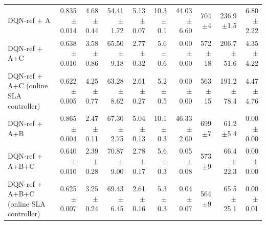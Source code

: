 \begin{table}[t]
\begin{tabular}{lrrrrrrrrr}
DQN-ref + A & 0.835$\pm$0.014 & 4.68$\pm$0.44 & 54.41$\pm$1.72 & 5.13$\pm$0.07 & 10.3$\pm$0.1 & 44.03$\pm$6.60 & 704$\pm$4 & 236.9$\pm$1.5 & 6.80$\pm$2.22 \\
DQN-ref + A+C & 0.638$\pm$0.010 & 3.58$\pm$0.86 & 65.50$\pm$9.18 & 2.77$\pm$0.32 & 5.6$\pm$0.6 & 0.00$\pm$0.00 & 572$\pm$18 & 206.7$\pm$51.6 & 4.35$\pm$4.22 \\
DQN-ref + A+C (online SLA controller) & 0.622$\pm$0.005 & 4.25$\pm$0.77 & 63.28$\pm$8.62 & 2.61$\pm$0.27 & 5.2$\pm$0.5 & 0.00$\pm$0.00 & 563$\pm$15 & 191.2$\pm$78.4 & 4.47$\pm$4.76 \\
DQN-ref + A+B & 0.865$\pm$0.004 & 2.47$\pm$0.11 & 67.30$\pm$2.75 & 5.04$\pm$0.13 & 10.1$\pm$0.3 & 46.33$\pm$2.00 & 699$\pm$7 & 61.2$\pm$5.4 & 0.00$\pm$0.00 \\
DQN-ref + A+B+C & 0.640$\pm$0.010 & 2.39$\pm$0.28 & 70.87$\pm$9.00 & 2.78$\pm$0.17 & 5.6$\pm$0.3 & 0.05$\pm$0.08 & 573$\pm$9 & 66.4$\pm$22.3 & 0.00$\pm$0.00 \\
DQN-ref + A+B+C (online SLA controller) & 0.625$\pm$0.007 & 3.25$\pm$0.24 & 69.43$\pm$6.45 & 2.61$\pm$0.16 & 5.3$\pm$0.3 & 0.04$\pm$0.07 & 564$\pm$9 & 65.5$\pm$25.1 & 0.00$\pm$0.01 \\
\bottomrule
\end{tabular}
\end{table}
